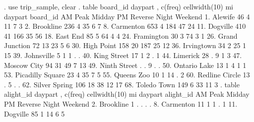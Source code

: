 . use trip_sample, clear
{\smallskip}
. table board_id daypart , c(freq) cellwidth(10) mi
{\smallskip}
                     {\VBAR}                          daypart                          
            board_id {\VBAR}    AM Peak      Midday  PM Reverse       Night     Weekend
          1. Alewife {\VBAR}         46           4          11           7           3
        2. Brookline {\VBAR}        236           4          35           6           7
        8. Carmenton {\VBAR}        653           4         184          47          24
        11. Dogville {\VBAR}        410          41         166          35          56
        18. East End {\VBAR}         85           5          64           4           4
      24. Framington {\VBAR}         30           3          74           3           1
  26. Grand Junction {\VBAR}         72          13          23           5           6
      30. High Point {\VBAR}        158          20         187          25          12
      36. Irvingtown {\VBAR}         34           2          25           1          15
      39. Johnsville {\VBAR}          5           1           1           .           .
     40. King Street {\VBAR}         17           1           2           .           1
        44. Limerick {\VBAR}         28           .           9           1           3
     47. Moscow City {\VBAR}         94          31          49           7          13
    49. Ninth Street {\VBAR}          .           .           9           .           .
    50. Ontario Lake {\VBAR}         13           1           4           1           1
53. Picadilly Square {\VBAR}         23           4          35           7           5
      55. Queens Zoo {\VBAR}         10           1          14           .           2
  60. Redline Circle {\VBAR}         13           .           5           .           .
   62. Silver Spring {\VBAR}        106          18          38          12          17
     68. Toledo Town {\VBAR}        149           6          33          11           3
{\smallskip}
. table alight_id daypart , c(freq) cellwidth(10) mi
{\smallskip}
                     {\VBAR}                          daypart                          
           alight_id {\VBAR}    AM Peak      Midday  PM Reverse       Night     Weekend
        2. Brookline {\VBAR}          1           .           .           .           .
        8. Carmenton {\VBAR}         11           1           1           .           1
        11. Dogville {\VBAR}         85           1          14           6           5
